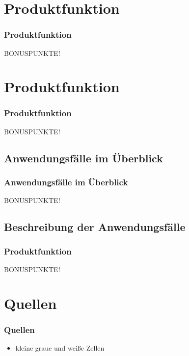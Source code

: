 \documentclass{beamer}
\begin{document}
\section{Produktfunktion}		
\begin{frame}
\frametitle{Produktfunktion}
BONUSPUNKTE!
\end{frame}

\section{Produktfunktion}		
\begin{frame}
\frametitle{Produktfunktion}
BONUSPUNKTE!
\end{frame}

\subsection{Anwendungsfälle im Überblick}		
\begin{frame}
\frametitle{Anwendungsfälle im Überblick}
BONUSPUNKTE!
\end{frame}

\subsection{Beschreibung der Anwendungsfälle}		
\begin{frame}
\frametitle{Produktfunktion}
BONUSPUNKTE!
\end{frame}

\section{Quellen}
\begin{frame}
		\frametitle{Quellen}
		\begin{itemize}
		  \item kleine graue und weiße Zellen
		\end{itemize}
	\end{frame}
\end{document}
